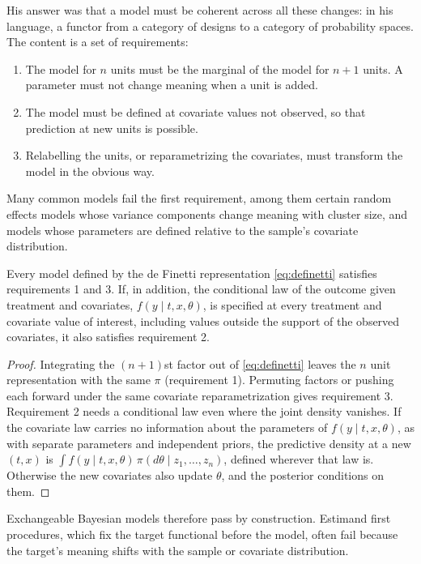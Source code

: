 His answer was that a model must be coherent across all these changes: in his language, a functor from a category of designs to a category of probability spaces. The content is a set of requirements:
\begin{enumerate}
\item The model for $n$ units must be the marginal of the model for $n + 1$ units. A parameter must not change meaning when a unit is added.
\item The model must be defined at covariate values not observed, so that prediction at new units is possible.
\item Relabelling the units, or reparametrizing the covariates, must transform the model in the obvious way.
\end{enumerate}
Many common models fail the first requirement, among them certain random effects models whose variance components change meaning with cluster size, and models whose parameters are defined relative to the sample's covariate distribution.

\begin{proposition}
Every model defined by the de Finetti representation \eqref{eq:definetti} satisfies requirements 1 and 3. If, in addition, the conditional law of the outcome given treatment and covariates, $f(y \mid t, x, \theta)$, is specified at every treatment and covariate value of interest, including values outside the support of the observed covariates, it also satisfies requirement 2.
\end{proposition}

\begin{proof}
Integrating the $(n+1)$st factor out of \eqref{eq:definetti} leaves the $n$ unit representation with the same $\pi$ (requirement 1). Permuting factors or pushing each forward under the same covariate reparametrization gives requirement 3. Requirement 2 needs a conditional law even where the joint density vanishes. If the covariate law carries no information about the parameters of $f(y \mid t, x, \theta)$, as with separate parameters and independent priors, the predictive density at a new $(t, x)$ is $\int f(y \mid t, x, \theta) \, \pi(d\theta \mid z_1, \ldots, z_n)$, defined wherever that law is. Otherwise the new covariates also update $\theta$, and the posterior conditions on them.
\end{proof}

Exchangeable Bayesian models therefore pass by construction. Estimand first procedures, which fix the target functional before the model, often fail because the target's meaning shifts with the sample or covariate distribution.

